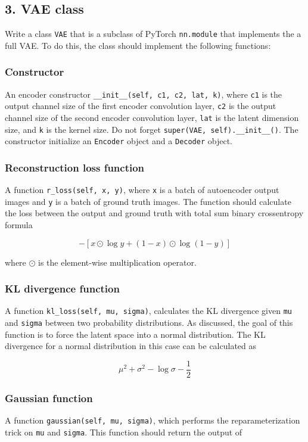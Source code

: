\documentclass{article}
\begin{document}
\subsection*{3. VAE class}
Write a class \texttt{VAE} that is a subclass of PyTorch \texttt{nn.module} that implements the a full VAE. To do this, the class should implement the following functions:
\subsubsection*{Constructor}
An encoder constructor \texttt{\_\_init\_\_(self, c1, c2, lat, k)}, where \texttt{c1} is the output channel size of the first encoder convolution layer, \texttt{c2} is the output channel size of the second encoder convolution layer, \texttt{lat} is the latent dimension size, and \texttt{k} is the kernel size. Do not forget \texttt{super(VAE, self).\_\_init\_\_()}. The constructor initialize an \texttt{Encoder} object and a \texttt{Decoder} object.

\subsubsection*{Reconstruction loss function}
A function \texttt{r\_loss(self, x, y)}, where \texttt{x} is a batch of autoencoder output images and  \texttt{y} is a batch of ground truth images. The function should calculate the loss between the output and ground truth with total sum binary crossentropy formula

\[-[x \odot \log y + (1 - x) \odot \log(1 - y )]\] 

\noindent
where $\odot$ is the element-wise multiplication operator.

\subsubsection*{KL divergence function}
A function \texttt{kl\_loss(self, mu, sigma)}, calculates the KL divergence given \texttt{mu} and \texttt{sigma} between two probability distributions. As discussed, the goal of this function is to force the latent space into a normal distribution. The KL divergence for a normal distribution in this case can be calculated as

\[\mu ^ 2 + \sigma ^ 2 - \log\sigma - \frac{1}{2}\]

\subsubsection*{Gaussian function}
A function \texttt{gaussian(self, mu, sigma)}, which performs the reparameterization trick on \texttt{mu} and \texttt{sigma}. This function should return the output of 
\end{document}
